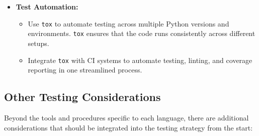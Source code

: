 \documentclass{ol-softwaremanual}
\begin{document}
\begin{itemize}
    \item \textbf{Test Automation:}
    \begin{itemize}
        \item Use \texttt{tox} to automate testing across multiple Python versions and environments. \texttt{tox} ensures that the code runs consistently across different setups.
        \item Integrate \texttt{tox} with CI systems to automate testing, linting, and coverage reporting in one streamlined process.
    \end{itemize}
\end{itemize}

\subsection{Other Testing Considerations}

Beyond the tools and procedures specific to each language, there are additional considerations that should be integrated into the testing strategy from the start:
\end{document}

